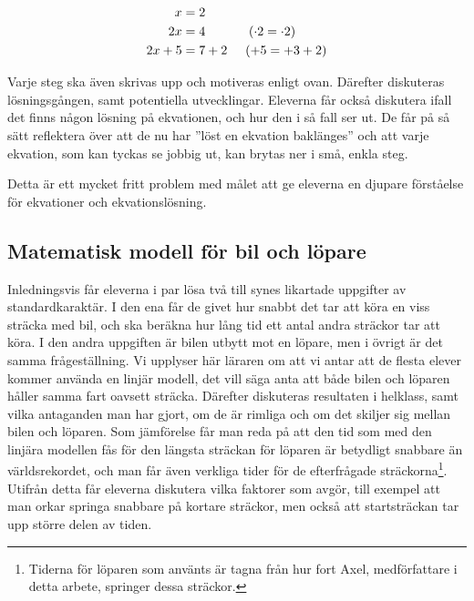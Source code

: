         \begin{align*}
            x&=2 \\
           2x&=4 \hspace{12mm} (\cdot2=\cdot2) \\
            2x+5&=7+2 \hspace{5mm} (+5=+3+2)
        \end{align*}
    
    \noindent\textcolor{lila}{Varje steg ska även skrivas upp och motiveras enligt ovan. Därefter diskuteras lösningsgången, samt potentiella utvecklingar. Eleverna får också diskutera ifall det finns någon lösning på ekvationen, och hur den i så fall ser ut. De får på så sätt reflektera över att de nu har ''löst en ekvation baklänges'' och att varje ekvation, som kan tyckas se jobbig ut, kan brytas ner i små, enkla steg.}
    
    \textcolor{lila}{Detta är ett mycket fritt problem med målet att ge eleverna en djupare förståelse för ekvationer och ekvationslösning.}

\subsection{Matematisk modell för bil och löpare}
    \label{sec:lopare}
    
    \textcolor{lila}{Inledningsvis får eleverna i par lösa två till synes likartade uppgifter av standardkaraktär. I den ena får de givet hur snabbt det tar att köra en viss sträcka med bil, och ska beräkna hur lång tid ett antal andra sträckor tar att köra. I den andra uppgiften är bilen utbytt mot en löpare, men i övrigt är det samma frågeställning. Vi upplyser här läraren om att vi antar att de flesta elever kommer använda en linjär modell, det vill säga anta att både bilen och löparen håller samma fart oavsett sträcka. Därefter diskuteras resultaten i helklass, samt vilka antaganden man har gjort, om de är rimliga och om det skiljer sig mellan bilen och löparen. Som jämförelse får man reda på att den tid som med den linjära modellen fås för den längsta sträckan för löparen är betydligt snabbare än världsrekordet, och man får även verkliga tider för de efterfrågade sträckorna\footnote{Tiderna för löparen som använts är tagna från hur fort Axel, medförfattare i detta arbete, springer dessa sträckor.}. Utifrån detta får eleverna diskutera vilka faktorer som avgör, till exempel att man orkar springa snabbare på kortare sträckor, men också att startsträckan tar upp större delen av tiden.}
    
